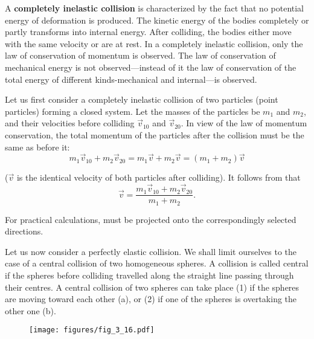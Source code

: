 A \textbf{completely inelastic collision} is characterized by the fact that no potential energy of deformation is produced. The kinetic energy of the bodies completely or partly transforms into internal energy. After colliding, the bodies either move with the same velocity or are at rest. In a completely inelastic collision, only the law of conservation of momentum is observed. The law of conservation of mechanical energy is not observed---instead of it the law of conservation of the total energy of different kinds-mechanical and internal---is observed.

Let us first consider a completely inelastic collision of two particles (point particles) forming a closed system. Let the masses of the particles be $m_1$ and $m_2$, and their velocities before colliding $\vec{v}_{10}$ and $\vec{v}_{20}$. In view of the law of momentum conservation, the total momentum of the particles after the collision must be the same as before it:
\begin{equation}\label{eq:3_93}
m_1\vec{v}_{10} + m_2\vec{v}_{20} = m_1\vec{v} + m_2\vec{v} = (m_1+m_2) \vec{v}
\end{equation}

\noindent
($\vec{v}$ is the identical velocity of both particles after colliding). It follows from  that
\begin{equation}\label{eq:3_94}
\vec{v} = \frac{m_1\vec{v}_{10} + m_2\vec{v}_{20}}{m_1+m_2}. 
\end{equation}

\noindent
For practical calculations,  must be projected onto the correspondingly selected directions.


Let us now consider a perfectly elastic collision. We shall limit ourselves to the case of a central collision of two homogeneous spheres. A collision is called central if the spheres before colliding travelled along the straight line passing through their centres. A central collision of two spheres can take place (1) if the spheres are moving toward each other (a), or (2) if one of the spheres is overtaking the other one (b).

\begin{figure}[t]
	\begin{center}
		\texttt{[image: figures/fig\_3\_16.pdf]}
		\caption[]{}
		\label{fig:3_16}
	\end{center}
	\vspace{-0.7cm}
\end{figure}


